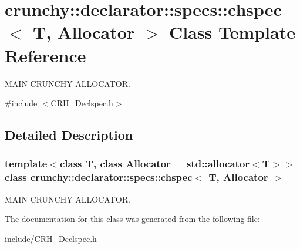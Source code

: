 \hypertarget{classcrunchy_1_1declarator_1_1specs_1_1chspec}{}\section{crunchy\+:\+:declarator\+:\+:specs\+:\+:chspec$<$ T, Allocator $>$ Class Template Reference}
\label{classcrunchy_1_1declarator_1_1specs_1_1chspec}


M\+A\+I\+N C\+R\+U\+N\+C\+H\+Y A\+L\+L\+O\+C\+A\+T\+O\+R.  




{\ttfamily \#include $<$C\+R\+H\+\_\+\+Declspec.\+h$>$}



\subsection{Detailed Description}
\subsubsection*{template$<$class T, class Allocator = std\+::allocator$<$\+T$>$$>$class crunchy\+::declarator\+::specs\+::chspec$<$ T, Allocator $>$}

M\+A\+I\+N C\+R\+U\+N\+C\+H\+Y A\+L\+L\+O\+C\+A\+T\+O\+R. 

The documentation for this class was generated from the following file\+:\begin{DoxyCompactItemize}
\item 
include/\hyperlink{_c_r_h___declspec_8h}{C\+R\+H\+\_\+\+Declspec.\+h}\end{DoxyCompactItemize}
